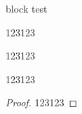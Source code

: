 \documentclass[aspectratio=169]{beamer}
\begin{document}
\begin{frame}{block test}

    \begin{corollary}[推論]
        123123
    \end{corollary}

    \begin{observation}[觀察]
        123123
    \end{observation}

    \begin{problem}[題目名稱]
        123123
    \end{problem}

    \begin{proof}
        123123
    \end{proof}

\end{frame}
\end{document}
